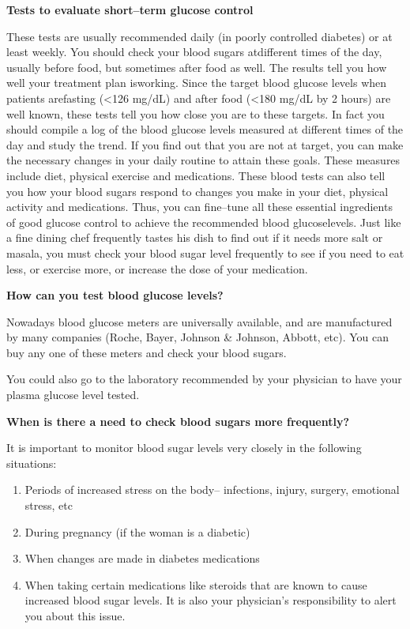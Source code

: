 \noindent\textbf{Tests to evaluate short–term glucose control}

These tests are usually recommended daily (in poorly controlled diabetes) or at least weekly. You should check your blood sugars at\break different times of the day, usually before food, but sometimes after food as well. The results tell you how well your treatment plan is\break working. Since the target blood glucose levels when patients are\break fasting (\textless  126 mg/dL) and after food (\textless  180 mg/dL by 2 hours) are well known, these tests tell you how close you are to these targets. In fact you should compile a log of the blood glucose levels measured at diffe\-rent times of the day and study the trend. If you find out that you are not at target, you can make the necessary changes in your daily routine to attain these goals. These measures include diet, physical exercise and medications. These blood tests can also tell you how your blood sugars respond to changes you make in your diet, physical activity and medications. Thus, you can fine–tune all these essential ingredients of good glucose control to achieve the recommended blood glucose\break levels. Just like a fine dining chef frequently tastes his dish to find out if it needs more salt or masala, you must check your blood sugar level frequently to see if you need to eat less, or exercise more, or increase the dose of your medication.

\noindent\textbf{How can you test blood glucose levels?}

Nowadays blood glucose meters are universally available, and are manufactured by many companies (Roche, Bayer, Johnson \& Johnson, Abbott, etc). You can buy any one of these meters and check your blood sugars.

You could also go to the laboratory recommended by your physician to have your plasma glucose level tested.

\noindent\textbf{When is there a need to check blood sugars more frequently?}

It is important to monitor blood sugar levels very closely in the following situations:

\begin{enumerate}[•]
\itemsep=0pt
\item Periods of increased stress on the body– infections, injury, surgery, emotional stress, etc
\item During pregnancy (if the woman is a diabetic)
\item When changes are made in diabetes medications
\item When taking certain medications like steroids that are known to cause increased blood sugar levels. It is also your physician’s responsibility to alert you about this issue.
\end{enumerate}

